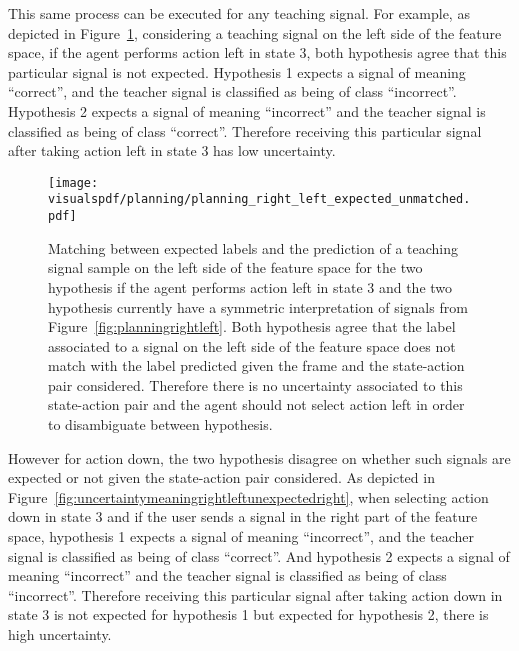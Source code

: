 This same process can be executed for any teaching signal. For example, as depicted in Figure~\ref{fig:uncertaintymeaningrightleftexpectedright}, considering a teaching signal on the left side of the feature space, if the agent performs action left in state 3, both hypothesis agree that this particular signal is not expected. Hypothesis 1 expects a signal of meaning ``correct'', and the teacher signal is classified as being of class ``incorrect''. Hypothesis 2 expects a signal of meaning ``incorrect'' and the teacher signal is classified as being of class ``correct''. Therefore receiving this particular signal after taking action left in state 3 has low uncertainty.

\begin{figure}[!htbp]
  \centering
  \texttt{[image: \\visualspdf/planning/planning\_right\_left\_expected\_unmatched.pdf]}
  \caption{Matching between expected labels and the prediction of a teaching signal sample on the left side of the feature space for the two hypothesis if the agent performs action left in state 3 and the two hypothesis currently have a symmetric interpretation of signals from Figure~\ref{fig:planningrightleft}. Both hypothesis agree that the label associated to a signal on the left side of the feature space does not match with the label predicted given the frame and the state-action pair considered. Therefore there is no uncertainty associated to this state-action pair and the agent should not select action left in order to disambiguate between hypothesis.}
  \label{fig:uncertaintymeaningrightleftexpectedright}
\end{figure}


However for action down, the two hypothesis disagree on whether such signals are expected or not given the state-action pair considered. As depicted in Figure~\ref{fig:uncertaintymeaningrightleftunexpectedright}, when selecting action down in state 3 and if the user sends a signal in the right part of the feature space, hypothesis 1 expects a signal of meaning ``incorrect'', and the teacher signal is classified as being of class ``correct''. And hypothesis 2 expects a signal of meaning ``incorrect'' and the teacher signal is classified as being of class ``incorrect''. Therefore receiving this particular signal after taking action down in state 3 is not expected for hypothesis 1 but expected for hypothesis 2, there is high uncertainty.

